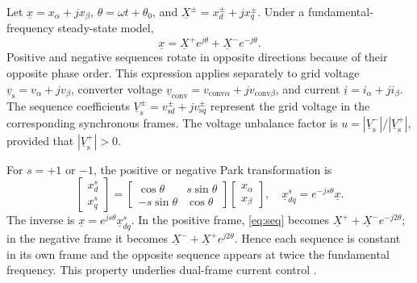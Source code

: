 Let \(\underline x=x_\alpha+jx_\beta\), \(\theta=\omega t+\theta_0\), and \(\underline X^\pm=x_d^\pm+jx_q^\pm\). Under a fundamental-frequency steady-state model,
\begin{equation}\label{eq:seq}
\underline x=\underline X^+e^{j\theta}+\underline X^-e^{-j\theta}.
\end{equation}
Positive and negative sequences rotate in opposite directions because of their opposite phase order. This expression applies separately to grid voltage \(\underline v_{\mathrm{s}}=v_\alpha+jv_\beta\), converter voltage \(\underline v_{\mathrm{conv}}=v_{\mathrm{conv}\alpha}+jv_{\mathrm{conv}\beta}\), and current \(\underline i=i_\alpha+ji_\beta\). The sequence coefficients \(\underline V_{\mathrm{s}}^\pm=v_{\mathrm{s}d}^\pm+jv_{\mathrm{s}q}^\pm\) represent the grid voltage in the corresponding synchronous frames. The voltage unbalance factor is \(u=|\underline V_{\mathrm{s}}^-|/|\underline V_{\mathrm{s}}^+|\), provided that \(|\underline V_{\mathrm{s}}^+|>0\).

For \(s=+1\) or \(-1\), the positive or negative Park transformation is
\begin{equation}\label{eq:ch4-park}
\begin{bmatrix}x_d^s\\x_q^s\end{bmatrix}=
\begin{bmatrix}\cos\theta&s\sin\theta\\-s\sin\theta&\cos\theta\end{bmatrix}
\begin{bmatrix}x_\alpha\\x_\beta\end{bmatrix},\quad
\underline x_{dq}^s=e^{-js\theta}\underline x.
\end{equation}
The inverse is \(\underline x=e^{js\theta}\underline x_{dq}^s\). In the positive frame, \eqref{eq:seq} becomes \(\underline X^++\underline X^-e^{-j2\theta}\); in the negative frame it becomes \(\underline X^-+\underline X^+e^{j2\theta}\). Hence each sequence is constant in its own frame and the opposite sequence appears at twice the fundamental frequency. This property underlies dual-frame current control \cite{song1999}.

